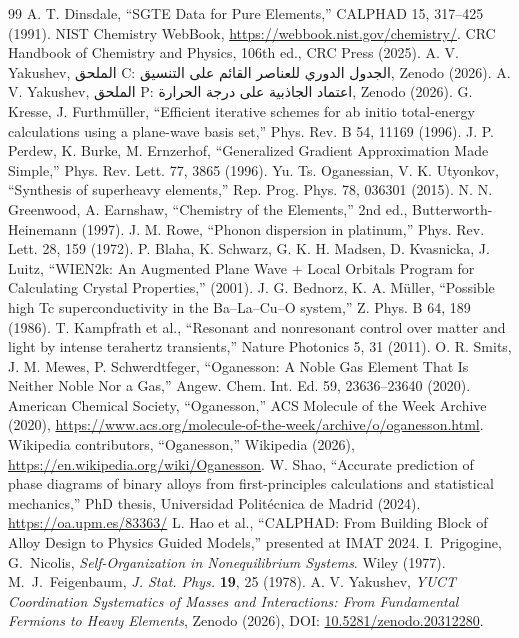 \documentclass[11pt,a4paper]{article}
\begin{document}
	\begin{thebibliography}{99}
		 A. T. Dinsdale, ``SGTE Data for Pure Elements,'' CALPHAD 15, 317–425 (1991).
		 NIST Chemistry WebBook, \url{https://webbook.nist.gov/chemistry/}.
		 CRC Handbook of Chemistry and Physics, 106th ed., CRC Press (2025).
		 A. V. Yakushev, الملحق C: الجدول الدوري للعناصر القائم على التنسيق, Zenodo (2026).
		 A. V. Yakushev, الملحق P: اعتماد الجاذبية على درجة الحرارة, Zenodo (2026).
		 G. Kresse, J. Furthmüller, ``Efficient iterative schemes for ab initio total-energy calculations using a plane-wave basis set,'' Phys. Rev. B 54, 11169 (1996).
		 J. P. Perdew, K. Burke, M. Ernzerhof, ``Generalized Gradient Approximation Made Simple,'' Phys. Rev. Lett. 77, 3865 (1996).
		 Yu. Ts. Oganessian, V. K. Utyonkov, ``Synthesis of superheavy elements,'' Rep. Prog. Phys. 78, 036301 (2015).
		 N. N. Greenwood, A. Earnshaw, ``Chemistry of the Elements,'' 2nd ed., Butterworth-Heinemann (1997).
		 J. M. Rowe, ``Phonon dispersion in platinum,'' Phys. Rev. Lett. 28, 159 (1972).
		 P. Blaha, K. Schwarz, G. K. H. Madsen, D. Kvasnicka, J. Luitz, ``WIEN2k: An Augmented Plane Wave + Local Orbitals Program for Calculating Crystal Properties,'' (2001).
		 J. G. Bednorz, K. A. Müller, ``Possible high Tc superconductivity in the Ba–La–Cu–O system,'' Z. Phys. B 64, 189 (1986).
		 T. Kampfrath et al., ``Resonant and nonresonant control over matter and light by intense terahertz transients,'' Nature Photonics 5, 31 (2011).
		 O. R. Smits, J. M. Mewes, P. Schwerdtfeger, ``Oganesson: A Noble Gas Element That Is Neither Noble Nor a Gas,'' Angew. Chem. Int. Ed. 59, 23636–23640 (2020).
		 American Chemical Society, ``Oganesson,'' ACS Molecule of the Week Archive (2020), \url{https://www.acs.org/molecule-of-the-week/archive/o/oganesson.html}.
		 Wikipedia contributors, ``Oganesson,'' Wikipedia (2026), \url{https://en.wikipedia.org/wiki/Oganesson}.
		 W. Shao, ``Accurate prediction of phase diagrams of binary alloys from first-principles calculations and statistical mechanics,'' PhD thesis, Universidad Politécnica de Madrid (2024). \url{https://oa.upm.es/83363/}
		 L. Hao et al., ``CALPHAD: From Building Block of Alloy Design to Physics Guided Models,'' presented at IMAT 2024.
		 I.~Prigogine, G.~Nicolis, \emph{Self-Organization in Nonequilibrium Systems}. Wiley (1977).
		 M.~J.~Feigenbaum, \emph{J. Stat. Phys.} \textbf{19}, 25 (1978).
		 A. V. Yakushev, \emph{YUCT Coordination Systematics of Masses and Interactions: From Fundamental Fermions to Heavy Elements}, Zenodo (2026), DOI: \href{https://doi.org/10.5281/zenodo.20312280}{10.5281/zenodo.20312280}.
	\end{thebibliography}
	
\end{document}
